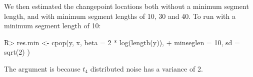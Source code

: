 \documentclass[article]{jss}
\begin{document}
We then estimated the changepoint locations both without a minimum segment length, and with minimum segment lengths of 10, 30 and 40. To run  with a minimum segment length of 10:
\begin{CodeChunk}
\begin{CodeInput}
R> res.min <- cpop(y, x, beta = 2 * log(length(y)),
+  minseglen = 10, sd = sqrt(2) )
\end{CodeInput}
\end{CodeChunk}
The argument  is because $t_4$ distributed noise has a variance of 2.
%
%
%
\end{document}
